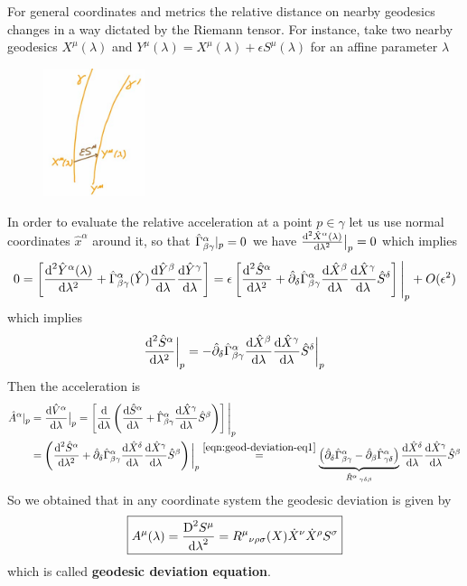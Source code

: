 \documentclass[../main/main.tex]{subfiles}
\begin{document}
For general coordinates and metrics the relative distance on nearby geodesics changes in a way dictated by the Riemann tensor. For instance, take two nearby geodesics $X^\mu(\lambda)$ and $Y^\mu(\lambda)=X^\mu(\lambda)+\epsilon S^\mu(\lambda)$ for an affine parameter $\lambda$
\begin{figure}[H]
\centering
\includegraphics[width=3cm]{../img/geodesic-deviation.jpg}
\end{figure}
\noindent
In order to evaluate the relative acceleration at a point $p\in\gamma$ let us use normal coordinates $\hat x^\alpha$ around it, so that ${\hat\Gamma}^{\alpha}_{\beta \gamma}\vert_p=0$ we have $\frac{\textup{d}^2\hat X^\alpha(\lambda)}{\textup{d}\lambda^2}\big\vert_p=0$ which implies
\[0=\left[\frac{\de^2\hat Y^\alpha(\lambda)}{\de\lambda^2}+\hchris\alpha\beta\gamma(\hat Y)\der{\hat Y^\beta}\lambda\der{\hat Y^\gamma}\lambda\right]=\epsilon\left[\frac{\de^2\hat S^\alpha}{\de\lambda^2}+\hpde\delta\hchris\alpha\beta\gamma\der{\hat X^\beta}\lambda\der{\hat X^\gamma}\lambda\hat S^\delta\right]\Bigg\vert_p+O(\epsilon^2)\]
which implies
\begin{equation}\label{eqn:geod-deviation-eq1}
\frac{\textup{d}^2\hat S^\alpha}{\textup{d}\lambda^2}\bigg\vert_p=-\hat\partial_{\delta}{\hat\Gamma}^{\alpha}_{\beta \gamma}\frac{\textup{d} \hat X^\beta}{\textup{d} \lambda}\frac{\textup{d} \hat X^\gamma}{\textup{d} \lambda}\hat S^\delta\bigg\vert_p
\end{equation}
Then the acceleration is
\begin{align*}
\hat A^\alpha\vert_p
&=\frac{\textup{d} \hat V^\alpha}{\textup{d} \lambda}\big\vert_p
=\left[\frac{\textup{d} }{\textup{d} \lambda}\left(\frac{\textup{d} \hat S^\alpha}{\textup{d} \lambda}+{\hat\Gamma}^{\alpha}_{\beta \gamma}\frac{\textup{d} \hat X^\gamma}{\textup{d} \lambda}\hat S^\beta\right)\right]\Bigg\vert_p\\
&=\left(\frac{\textup{d}^2\hat S^\alpha}{\textup{d}\lambda^2}+\hat\partial_{\delta}{\hat\Gamma}^{\alpha}_{\beta \gamma}\frac{\textup{d} \hat X^\delta}{\textup{d} \lambda}\frac{\textup{d} \hat X^\gamma}{\textup{d} \lambda}\hat S^\beta\right)\bigg\vert_p
\overset{\eqref{eqn:geod-deviation-eq1}}{=}
\underbrace{\left(\hat\partial_{\delta}{\hat\Gamma}^{\alpha}_{\beta \gamma}-\hat\partial_{\beta}{\hat\Gamma}^{\alpha}_{\gamma \delta}\right)}_{{{{{\hat R}}^{\alpha}\,}}_{\gamma \delta \beta}}\frac{\textup{d} \hat X^\delta}{\textup{d} \lambda}\frac{\textup{d} \hat X^\gamma}{\textup{d} \lambda}\hat S^\beta
\end{align*}
So we obtained that in any coordinate system the geodesic deviation is given by
\begin{equation}\boxed{
A^\mu(\lambda)=\frac{\text{D}^2 S^\mu}{{\textup{d} \lambda}^2}={{R}^{\mu}}_{\nu \rho \sigma}(X)\dot X^\nu\dot X^\rho S^\sigma
}\end{equation}
which is called \textbf{geodesic deviation equation}. 
\end{document}
